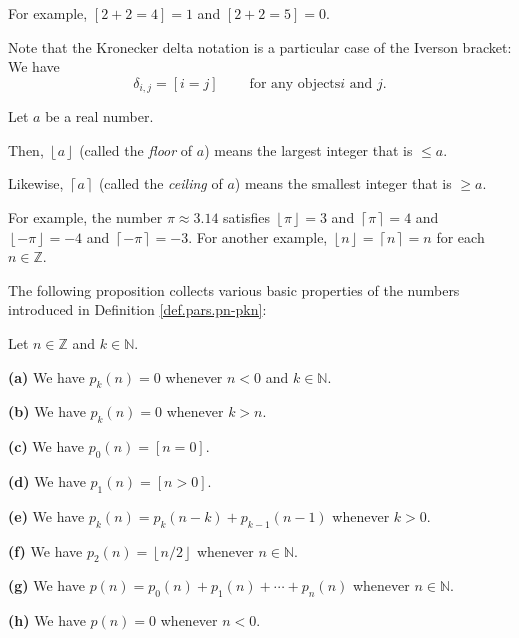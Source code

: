 For example, $\left[  2+2=4\right]  =1$ and $\left[  2+2=5\right]  =0$.

Note that the Kronecker delta notation is a particular case of the Iverson
bracket: We have
\[
\delta_{i,j}=\left[  i=j\right]  \ \ \ \ \ \ \ \ \ \ \text{for any objects
}i\text{ and }j.
\]


\begin{definition}
\label{def.pars.floor-ceil}Let $a$ be a real number.

Then, $\left\lfloor a\right\rfloor $ (called the \emph{floor} of $a$) means
the largest integer that is $\leq a$.

Likewise, $\left\lceil a\right\rceil $ (called the \emph{ceiling} of $a$)
means the smallest integer that is $\geq a$.
\end{definition}

For example, the number $\pi\approx3.14$ satisfies $\left\lfloor
\pi\right\rfloor =3$ and $\left\lceil \pi\right\rceil =4$ and $\left\lfloor
-\pi\right\rfloor =-4$ and $\left\lceil -\pi\right\rceil =-3$. For another
example, $\left\lfloor n\right\rfloor =\left\lceil n\right\rceil =n$ for each
$n\in\mathbb{Z}$.

The following proposition collects various basic properties of the numbers
introduced in Definition \ref{def.pars.pn-pkn}:

\begin{proposition}
\label{prop.pars.basics}Let $n\in\mathbb{Z}$ and $k\in\mathbb{N}$. \medskip

\textbf{(a)} We have $p_{k}\left(  n\right)  =0$ whenever $n<0$ and
$k\in\mathbb{N}$. \medskip

\textbf{(b)} We have $p_{k}\left(  n\right)  =0$ whenever $k>n$. \medskip

\textbf{(c)} We have $p_{0}\left(  n\right)  =\left[  n=0\right]  $. \medskip

\textbf{(d)} We have $p_{1}\left(  n\right)  =\left[  n>0\right]  $. \medskip

\textbf{(e)} We have $p_{k}\left(  n\right)  =p_{k}\left(  n-k\right)
+p_{k-1}\left(  n-1\right)  $ whenever $k>0$. \medskip

\textbf{(f)} We have $p_{2}\left(  n\right)  =\left\lfloor n/2\right\rfloor $
whenever $n\in\mathbb{N}$. \medskip

\textbf{(g)} We have $p\left(  n\right)  =p_{0}\left(  n\right)  +p_{1}\left(
n\right)  +\cdots+p_{n}\left(  n\right)  $ whenever $n\in\mathbb{N}$. \medskip

\textbf{(h)} We have $p\left(  n\right)  =0$ whenever $n<0$.
\end{proposition}

